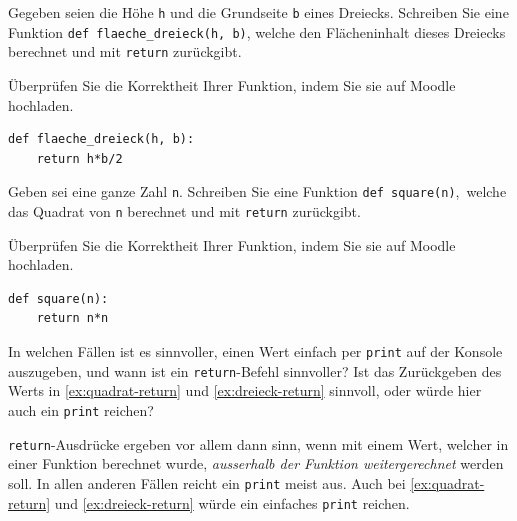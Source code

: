 \begin{mysubmission}\label{ex:dreieck-return}
	Gegeben seien die Höhe \texttt{h} und die Grundseite \texttt{b} eines Dreiecks. Schreiben Sie eine Funktion \lstinline|def flaeche_dreieck(h, b)|, welche den Flächeninhalt dieses Dreiecks berechnet und mit \lstinline|return| zurückgibt.

	Überprüfen Sie die Korrektheit Ihrer Funktion, indem Sie sie auf Moodle hochladen.
	\begin{myanswer}
		\begin{lstlisting}
def flaeche_dreieck(h, b):
    return h*b/2
\end{lstlisting}
	\end{myanswer}
\end{mysubmission}

\begin{mysubmission}\label{ex:quadrat-return}
	Geben sei eine ganze Zahl \texttt{n}. Schreiben Sie eine Funktion \lstinline|def square(n)|, welche das Quadrat von \lstinline|n| berechnet und mit \lstinline|return| zurückgibt.

	Überprüfen Sie die Korrektheit Ihrer Funktion, indem Sie sie auf Moodle hochladen.
	\begin{myanswer}
		\begin{lstlisting}
def square(n):
    return n*n
\end{lstlisting}
	\end{myanswer}
\end{mysubmission}

\begin{myexercise}\label{ex:print-vs-return}
	In welchen Fällen ist es sinnvoller, einen Wert einfach per \lstinline|print| auf der Konsole auszugeben, und wann ist ein \lstinline|return|-Befehl sinnvoller? Ist das Zurückgeben des Werts in \cref{ex:quadrat-return} und \cref{ex:dreieck-return} sinnvoll, oder würde hier auch ein \lstinline|print| reichen?
	\begin{myanswer}
		\lstinline|return|-Ausdrücke ergeben vor allem dann sinn, wenn mit einem Wert, welcher in einer Funktion berechnet wurde, \textit{ausserhalb der Funktion weitergerechnet} werden soll. In allen anderen Fällen reicht ein \lstinline|print| meist aus. Auch bei \cref{ex:quadrat-return} und \cref{ex:dreieck-return} würde ein einfaches \lstinline|print| reichen.
	\end{myanswer}
\end{myexercise}



